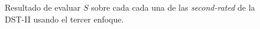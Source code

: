 \begin{figure}
	\centering
	\caption{Resultado de evaluar $S$ sobre cada cada una de las \textit{second-rated} de la DST-II usando el tercer enfoque.} \label{fig:gaussian-example-approach3}
\end{figure}

